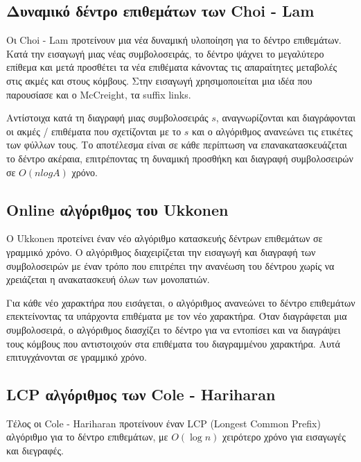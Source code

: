         \subsection{Δυναμικό δέντρο επιθεμάτων των Choi - Lam}
            Οι Choi - Lam προτείνουν μια νέα δυναμική υλοποίηση για το δέντρο επιθεμάτων. \cite{Choi_Lam_1997}
            Κατά την εισαγωγή μιας νέας συμβολοσειράς, το δέντρο ψάχνει το μεγαλύτερο επίθεμα και μετά προσθέτει τα νέα επιθέματα κάνοντας τις απαραίτητες μεταβολές στις ακμές και στους κόμβους.
            Στην εισαγωγή χρησιμοποιείται μια ιδέα που παρουσίασε και ο McCreight, τα suffix links.

            Αντίστοιχα κατά τη διαγραφή μιας συμβολοσειράς \(s\), αναγνωρίζονται και διαγράφονται οι ακμές / επιθέματα που σχετίζονται με το \(s\) και ο αλγόριθμος ανανεώνει τις ετικέτες των φύλλων τους.
            Το αποτέλεσμα είναι σε κάθε περίπτωση να επανακατασκευάζεται το δέντρο ακέραια, επιτρέποντας τη δυναμική προσθήκη και διαγραφή συμβολοσειρών σε \(O(nlogA)\) χρόνο.

        \subsection{Online αλγόριθμος του Ukkonen}
            O Ukkonen προτείνει έναν νέο αλγόριθμο κατασκευής δέντρων επιθεμάτων σε γραμμικό χρόνο. \cite{Ukkonen_1995}
            Ο αλγόριθμος διαχειρίζεται την εισαγωγή και διαγραφή των συμβολοσειρών με έναν τρόπο που επιτρέπει την ανανέωση του δέντρου χωρίς να χρειάζεται η ανακατασκευή όλων των μονοπατιών.

            Για κάθε νέο χαρακτήρα που εισάγεται, ο αλγόριθμος ανανεώνει το δέντρο επιθεμάτων επεκτείνοντας τα υπάρχοντα επιθέματα με τον νέο χαρακτήρα.
            Όταν διαγράφεται μια συμβολοσειρά, ο αλγόριθμος διασχίζει το δέντρο για να εντοπίσει και να διαγράψει τους κόμβους που αντιστοιχούν στα επιθέματα του διαγραμμένου χαρακτήρα.
            Αυτά επιτυγχάνονται σε γραμμικό χρόνο.

        \subsection{LCP αλγόριθμος των Cole - Hariharan}
            Τέλος οι Cole - Hariharan προτείνουν έναν LCP (Longest Common Prefix) αλγόριθμο για το δέντρο επιθεμάτων, με \(O(\log n)\) χειρότερο χρόνο για εισαγωγές και διεγραφές. \cite{Cole_Hariharan_2005}
